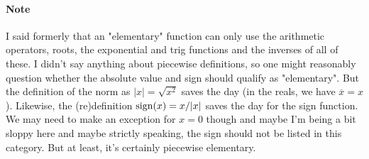\paragraph{Note}
I said formerly that an "elementary" function can only use the arithmetic operators, roots, the exponential and trig functions and the inverses of all of these. I didn't say anything about piecewise definitions, so one might reasonably question whether the absolute value and sign should qualify as "elementary". But the definition of the norm as $|x| = \sqrt{x^2}$ saves the day (in the reals, we have $\overline{x} = x$). Likewise, the (re)definition $\operatorname{sign}(x) = x / |x|$ saves the day for the sign function. We may need to make an exception for $x = 0$ though and maybe I'm being a bit sloppy here and maybe strictly speaking, the sign should not be listed in this category. But at least, it's certainly piecewise elementary.



